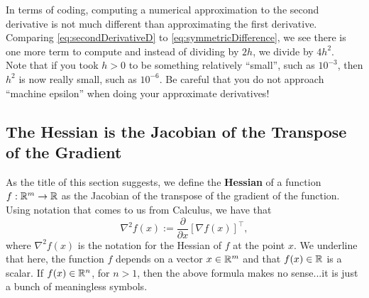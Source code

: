 In terms of coding, computing a numerical approximation to the second derivative is not much different than approximating the first derivative. Comparing \eqref{eq:secondDerivativeD} to \eqref{eq:symmetricDifference}, we see there is one more term to compute and instead of dividing by $2h$, we divide by $4 h^2$. \\

Note that if you took $h>0$ to be something relatively ``small'', such as $10^{-3}$, then $h^2$ is now really small, such as  $10^{-6}$. Be careful that you do not approach ``machine epsilon'' when doing your approximate derivatives!

\subsection{The Hessian is the Jacobian of the Transpose of the Gradient}
\label{sec:Hessian}

As the title of this section suggests, we define the \textbf{Hessian} of a function $f:\mathbb R^m \to \mathbb R$ as the Jacobian of the transpose of the gradient of the function. Using notation that comes to us from Calculus, we have that 
\begin{equation}
    \label{eq:Hessian}
    \nabla^2 f(x) := \frac{\partial}{\partial x} \left[ \nabla f(x) \right]^\top,
\end{equation}
where $ \nabla^2 f(x)$ is the notation for the Hessian of $f$ at the point $x$. We underline that here, the function $f$ depends on a vector $x \in \mathbb R^m$ and that $f(x) \in \mathbb R$ is a scalar. If $f(x) \in \mathbb R^n$, for $n > 1$, then the above formula makes no sense...it is just a bunch of meaningless symbols.\\

